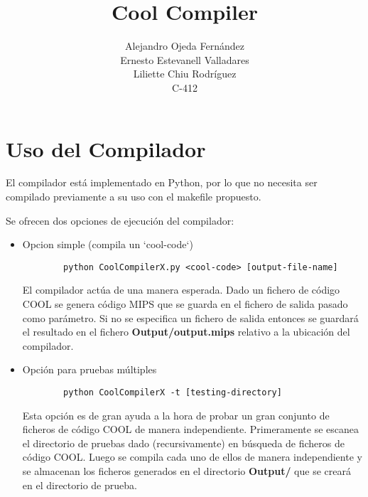 \documentclass[]{article}
\title{Cool Compiler}
\author{Alejandro Ojeda Fern\'andez\\Ernesto Estevanell Valladares\\Liliette Chiu Rodr\'iguez\\C-412}
\date{\dotfill}
\begin{document}
\maketitle
\section{Uso del Compilador}
El compilador est\'a implementado en Python, por lo que no necesita ser compilado previamente a su uso con el makefile propuesto.

Se ofrecen dos opciones de ejecuci\'on del compilador:
\begin{itemize}
	\item Opcion simple (compila un `cool-code`)\\
	\begin{lstlisting}
		python CoolCompilerX.py <cool-code> [output-file-name]
	\end{lstlisting}
	
	El compilador act\'ua de una manera esperada. Dado un fichero de c\'odigo COOL se genera c\'odigo MIPS que se guarda en el fichero de salida pasado como par\'ametro.
	Si no se especifica un fichero de salida entonces se guardar\'a el resultado en el fichero \textbf{Output/output.mips} relativo a la ubicaci\'on del compilador.
	
	\item Opci\'on para pruebas m\'ultiples\\
	\begin{lstlisting}
		python CoolCompilerX -t [testing-directory]
	\end{lstlisting}
	
	Esta opci\'on es de gran ayuda a la hora de probar un gran conjunto de ficheros de c\'odigo COOL de manera independiente. Primeramente se escanea el directorio de pruebas dado (recursivamente) en b\'usqueda de ficheros de c\'odigo COOL. Luego se compila cada uno de ellos de manera independiente y se almacenan los ficheros generados en el directorio \textbf{Output/} que se crear\'a en el directorio de prueba.
\end{itemize}
\end{document}
